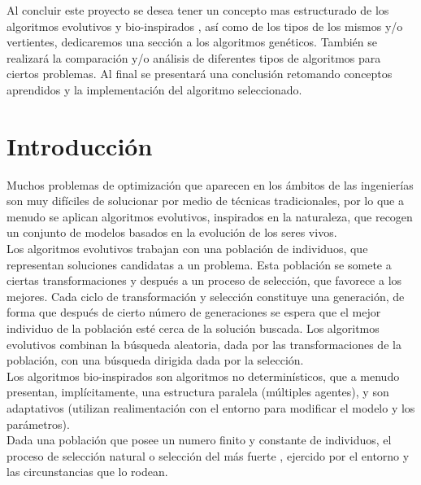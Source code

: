 \documentclass{article}
\begin{document}
Al concluir este proyecto se desea tener un concepto mas estructurado  de los algoritmos evolutivos y bio-inspirados , así como de los tipos de los mismos y/o  vertientes, dedicaremos una sección a los algoritmos gen\'eticos. También se realizar\'a la comparaci\'on y/o an\'alisis de diferentes tipos de algoritmos para  ciertos problemas. Al final se presentar\'a una conclusi\'on retomando conceptos aprendidos y la implementaci\'on del algoritmo seleccionado.

\section{Introducción}


Muchos problemas de optimización que aparecen en los ámbitos de las ingenierías
son muy difíciles de solucionar por medio de técnicas tradicionales, por lo que a
menudo se aplican algoritmos evolutivos, inspirados en la naturaleza, que recogen un
conjunto de modelos basados en la evolución de los seres vivos.\\


Los algoritmos evolutivos trabajan con una población de individuos, que representan soluciones candidatas a un problema. Esta población se somete a ciertas transformaciones y después a un proceso de selección, que favorece a los mejores. Cada ciclo de transformación y selección constituye una generación, de forma que después de cierto número de generaciones se espera que el mejor individuo de la población esté cerca de la solución buscada. Los algoritmos evolutivos combinan la búsqueda aleatoria, dada por las transformaciones de la población, con una búsqueda dirigida dada por la selección.   \\

Los algoritmos bio-inspirados son algoritmos no determinísticos, que a menudo presentan, implícitamente, una estructura paralela (múltiples agentes), y son adaptativos (utilizan realimentación con el entorno para modificar el modelo y los parámetros).\\

Dada una población que posee un numero finito y constante de individuos, el proceso de selección natural o selección del m\'as fuerte , ejercido por el entorno y las circunstancias que lo rodean.
\end{document}
